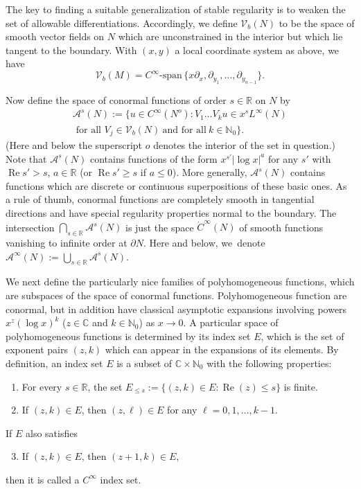 \documentclass[11pt]{article}
\newenvironment{enumeratea}
{\bgroup\def\theenumi{\alph{enumi}}\begin{enumerate}}
{\end{enumerate}\egroup}
\DeclareMathOperator{\Real}{Re}
\theoremstyle{plain}
\theoremstyle{definition}
\theoremstyle{remark}
\def\Rm{{\mathbb{R}}}
\def\Cm{{\mathbb{C}}}
\def\Nm{{\mathbb{N}}}
\def\A{\mathcal{A}}
\newcommand{\del}{\partial}
\begin{document}
The key to finding a suitable generalization of stable regularity is to weaken the set of allowable differentiations. Accordingly, we define $\mathcal V_b(N)$ to be the space of smooth vector fields on $N$ which are unconstrained in the interior but which lie tangent to the boundary. With $(x, y)$ a local coordinate system as above, we have\vspace*{-3pt}
\begin{equation}
\mathcal V_b(M) = C^\infty\text{-}\mathrm{span}\, \{ x\del_x, \del_{y_1}, \ldots, \del_{y_{n-1}} \}.
\label{Vb}
\end{equation}

Now define the space of conormal functions of order $s \in \mathbb R$ on $N$ by\vspace*{-5pt}
\begin{multline*}
\A^s (N) := \{u\in C^\infty(N^{o}): V_1 \ldots V_k u \in x^s L^\infty(N) \\
\text{ for all } V_j \in \mathcal V_b(N)\ \mbox{and for all}\ k \in \mathbb N_0\}.
\end{multline*}
(Here and below the superscript $o$ denotes the interior of the set in question.) Note that $\A^s(N)$ contains functions of the form $x^{s'}|{\log x}|^a$ for any $s'$ with $\Real s' > s$, $a \in \mathbb R$ (or $\Real s' \geq s$ if $a \leq 0$). More generally, $\A^s(N)$ contains functions which are discrete or continuous superpositions of these basic ones. As a rule of thumb, conormal functions are completely smooth in tangential directions and have special regularity properties normal to the boundary. The intersection $\bigcap_{s\in \Rm} \A^s (N)$ is just the space $\dot{C}^\infty (N)$ of smooth functions vanishing to infinite order at $\partial N$. Here and below, we~denote $\A^\infty(N) := \bigcup_{s\in \Rm} \A^s(N)$.

We next define the particularly nice families of polyhomogeneous functions, which are subspaces of the space of conormal functions.
Polyhomogeneous function are conormal, but in addition have classical asymptotic expansions involving
powers $x^z (\log x)^k$ ($z \in \mathbb C$ and $k \in \mathbb N_0$) as $x \to 0$. A particular space of polyhomogeneous
functions is determined by its index set $E$, which is the set of exponent pairs $(z,k)$ which
can appear in the expansions of its elements. By definition, an index set $E$ is a subset of $\Cm\times \Nm_0$ with the following properties:

\begin{enumeratea}
\item\label{cond:a}
For every $s\in \Rm$, the set $E_{\le s} := \{(z,k)\in E : \Real (z)\le s\}$ is finite.
\item\label{cond:b}
If $(z,k)\in E$, then $(z,\ell)\in E$ for any $\ell = 0,1,\dots,k-1$.
\end{enumeratea}
\noindent
If $E$ also satisfies
\begin{enumeratea}\setcounter{enumi}{2}
\item\label{cond:c}
If $(z,k)\in E$, then $(z+1,k)\in E$,
\end{enumeratea}
\noindent
then it is called a $C^\infty$ index set.
\end{document}
